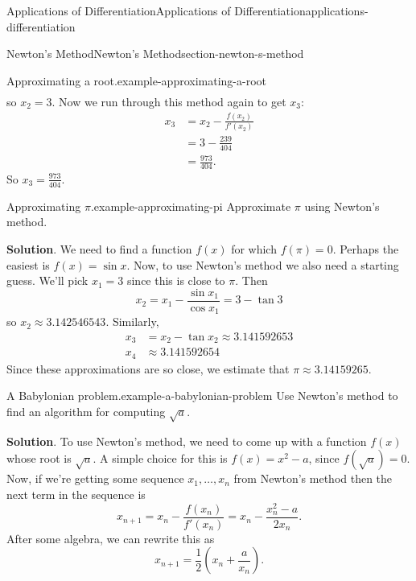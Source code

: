 \documentclass[oneside,10pt,]{book}
\numberwithin{equation}{section}
\begin{document}
\begin{chapterptx}{Applications of Differentiation}{}{Applications of Differentiation}{}{}{applications-differentiation}
\begin{sectionptx}{Newton's Method}{}{Newton's Method}{}{}{section-newton-s-method}
\begin{example}{Approximating a root.}{example-approximating-a-root}
\begin{align*}
\end{align*}
so \(x_{2} = 3\). Now we run through this method again to get \(x_{3}\):%
\begin{align*}
x_{3} & = x_{2} - \frac{f(x_{2})}{f'(x_{2})} \\
& = 3 - \frac{239}{404} \\
& = \frac{973}{404}. 
\end{align*}
So \(x_{3} = \frac{973}{404}.\)%
\end{example}
\begin{example}{Approximating \(\pi\).}{example-approximating-pi}%
\hypertarget{p-371}{}%
Approximate \(\pi\) using Newton's method.%
\par\smallskip%
\noindent\textbf{Solution}.\hypertarget{solution-82}{}\quad%
\hypertarget{p-372}{}%
We need to find a function \(f(x)\) for which \(f(\pi) = 0\). Perhaps the easiest is \(f(x) = \sin x\). Now, to use Newton's method we also need a starting guess. We'll pick \(x_{1} = 3\) since this is close to \(\pi\). Then%
\begin{equation*}
x_{2} = x_{1} - \frac{\sin x_{1}}{\cos x_{1}} = 3 - \tan 3
\end{equation*}
so \(x_{2} \approx 3.142546543\). Similarly,%
\begin{align*}
x_{3} & = x_{2} - \tan x_{2} \approx 3.141592653 \\
x_{4} & \approx 3.141592654 
\end{align*}
Since these approximations are so close, we estimate that \(\pi\approx 3.14159265\).%
\end{example}
\begin{example}{A Babylonian problem.}{example-a-babylonian-problem}%
\hypertarget{p-373}{}%
Use Newton's method to find an algorithm for computing \(\sqrt{a}\).%
\par\smallskip%
\noindent\textbf{Solution}.\hypertarget{solution-83}{}\quad%
\hypertarget{p-374}{}%
To use Newton's method, we need to come up with a function \(f(x)\) whose root is \(\sqrt{a}\). A simple choice for this is \(f(x) = x^{2} - a\), since \(f(\sqrt{a}) = 0\). Now, if we're getting some sequence \(x_{1},\ldots,x_{n}\) from Newton's method then the next term in the sequence is%
\begin{equation*}
x_{n+1} = x_{n} - \frac{f(x_{n})}{f'(x_{n})} = x_{n} - \frac{x_{n}^{2} - a}{2x_{n}}.
\end{equation*}
After some algebra, we can rewrite this as%
\begin{equation*}
x_{n+1} = \frac{1}{2}\left(x_{n} + \frac{a}{x_{n}}\right).

\end{equation*}
\end{example}
\end{sectionptx}
\end{chapterptx}
\end{document}
